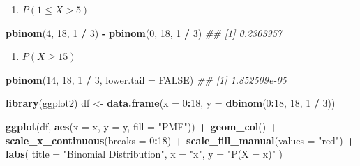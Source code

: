 \documentclass[
]{article}
\newenvironment{Shaded}{\begin{snugshade}}{\end{snugshade}}
\newcommand{\CommentTok}[1]{\textcolor[rgb]{0.56,0.35,0.01}{\textit{#1}}}
\newcommand{\DataTypeTok}[1]{\textcolor[rgb]{0.13,0.29,0.53}{#1}}
\newcommand{\DecValTok}[1]{\textcolor[rgb]{0.00,0.00,0.81}{#1}}
\newcommand{\KeywordTok}[1]{\textcolor[rgb]{0.13,0.29,0.53}{\textbf{#1}}}
\newcommand{\NormalTok}[1]{#1}
\newcommand{\OperatorTok}[1]{\textcolor[rgb]{0.81,0.36,0.00}{\textbf{#1}}}
\newcommand{\OtherTok}[1]{\textcolor[rgb]{0.56,0.35,0.01}{#1}}
\newcommand{\StringTok}[1]{\textcolor[rgb]{0.31,0.60,0.02}{#1}}
\providecommand{\tightlist}{%
  \setlength{\itemsep}{0pt}\setlength{\parskip}{0pt}}
\begin{document}
\begin{enumerate}
\def\labelenumi{\arabic{enumi}.}
\setcounter{enumi}{2}
\tightlist
\item
  \(P(1 \le X > 5)\)
\end{enumerate}

\begin{Shaded}
\begin{Highlighting}[]
\KeywordTok{pbinom}\NormalTok{(}\DecValTok{4}\NormalTok{, }\DecValTok{18}\NormalTok{, }\DecValTok{1} \OperatorTok{/}\StringTok{ }\DecValTok{3}\NormalTok{) }\OperatorTok{{-}}\StringTok{ }\KeywordTok{pbinom}\NormalTok{(}\DecValTok{0}\NormalTok{, }\DecValTok{18}\NormalTok{, }\DecValTok{1} \OperatorTok{/}\StringTok{ }\DecValTok{3}\NormalTok{)}
\CommentTok{\#\# [1] 0.2303957}
\end{Highlighting}
\end{Shaded}

\begin{enumerate}
\def\labelenumi{\arabic{enumi}.}
\setcounter{enumi}{3}
\tightlist
\item
  \(P(X \ge 15)\)
\end{enumerate}

\begin{Shaded}
\begin{Highlighting}[]
\KeywordTok{pbinom}\NormalTok{(}\DecValTok{14}\NormalTok{, }\DecValTok{18}\NormalTok{, }\DecValTok{1} \OperatorTok{/}\StringTok{ }\DecValTok{3}\NormalTok{, }\DataTypeTok{lower.tail =} \OtherTok{FALSE}\NormalTok{)}
\CommentTok{\#\# [1] 1.852509e{-}05}
\end{Highlighting}
\end{Shaded}

\begin{Shaded}
\begin{Highlighting}[]
\KeywordTok{library}\NormalTok{(ggplot2)}
\NormalTok{df \textless{}{-}}\StringTok{ }\KeywordTok{data.frame}\NormalTok{(}\DataTypeTok{x =} \DecValTok{0}\OperatorTok{:}\DecValTok{18}\NormalTok{, }\DataTypeTok{y =} \KeywordTok{dbinom}\NormalTok{(}\DecValTok{0}\OperatorTok{:}\DecValTok{18}\NormalTok{, }\DecValTok{18}\NormalTok{, }\DecValTok{1} \OperatorTok{/}\StringTok{ }\DecValTok{3}\NormalTok{))}

\KeywordTok{ggplot}\NormalTok{(df, }\KeywordTok{aes}\NormalTok{(}\DataTypeTok{x =}\NormalTok{ x, }\DataTypeTok{y =}\NormalTok{ y, }\DataTypeTok{fill =} \StringTok{"PMF"}\NormalTok{)) }\OperatorTok{+}
\StringTok{  }\KeywordTok{geom\_col}\NormalTok{() }\OperatorTok{+}
\StringTok{  }\KeywordTok{scale\_x\_continuous}\NormalTok{(}\DataTypeTok{breaks =} \DecValTok{0}\OperatorTok{:}\DecValTok{18}\NormalTok{) }\OperatorTok{+}
\StringTok{  }\KeywordTok{scale\_fill\_manual}\NormalTok{(}\DataTypeTok{values =} \StringTok{"red"}\NormalTok{) }\OperatorTok{+}
\StringTok{  }\KeywordTok{labs}\NormalTok{(}
    \DataTypeTok{title =} \StringTok{"Binomial Distribution"}\NormalTok{,}
    \DataTypeTok{x =} \StringTok{"x"}\NormalTok{,}
    \DataTypeTok{y =} \StringTok{"P(X = x)"}
\NormalTok{  )}
\end{Highlighting}
\end{Shaded}
\end{document}
